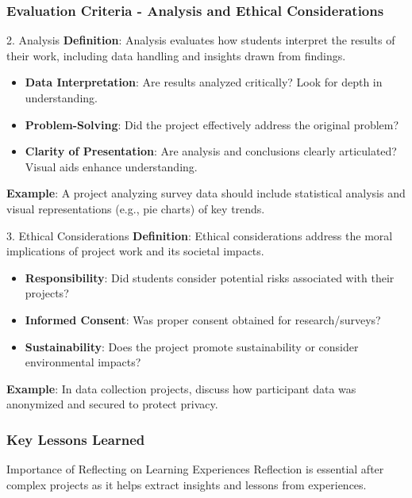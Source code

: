 \documentclass[aspectratio=169]{beamer}
\begin{document}
\begin{frame}[fragile]
    \frametitle{Evaluation Criteria - Analysis and Ethical Considerations}
    \begin{block}{2. Analysis}
        \textbf{Definition}: Analysis evaluates how students interpret the results of their work, including data handling and insights drawn from findings.
        
        \begin{itemize}
            \item \textbf{Data Interpretation}: Are results analyzed critically? Look for depth in understanding.
            \item \textbf{Problem-Solving}: Did the project effectively address the original problem?
            \item \textbf{Clarity of Presentation}: Are analysis and conclusions clearly articulated? Visual aids enhance understanding.
        \end{itemize}
        
        \textbf{Example}: A project analyzing survey data should include statistical analysis and visual representations (e.g., pie charts) of key trends.
    \end{block}

    \begin{block}{3. Ethical Considerations}
        \textbf{Definition}: Ethical considerations address the moral implications of project work and its societal impacts.
        
        \begin{itemize}
            \item \textbf{Responsibility}: Did students consider potential risks associated with their projects?
            \item \textbf{Informed Consent}: Was proper consent obtained for research/surveys?
            \item \textbf{Sustainability}: Does the project promote sustainability or consider environmental impacts?
        \end{itemize}
        
        \textbf{Example}: In data collection projects, discuss how participant data was anonymized and secured to protect privacy.
    \end{block}
\end{frame}

\begin{frame}[fragile]
    \frametitle{Key Lessons Learned}
    \begin{block}{Importance of Reflecting on Learning Experiences}
    Reflection is essential after complex projects as it helps extract insights and lessons from experiences.
    \end{block}
\end{frame}
\end{document}
